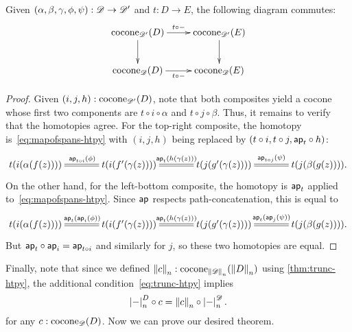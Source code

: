 \begin{lem}\label{thm:conemap-funct}
  Given $(\alpha,\beta,\gamma,\phi,\psi):\Ddiag \to \Ddiag'$ and $t:D\to E$, the following diagram commutes:
  \begin{equation*}
    \vcenter{\xymatrix{
        \cocone{\Ddiag'}{D}\ar[r]^-{t\circ -}\ar[d] &
        \cocone{\Ddiag'}{E}\ar[d]\\
        \cocone{\Ddiag}{D}\ar[r]_-{t\circ -} &
        \cocone{\Ddiag}{E}
      }}
  \end{equation*}
\end{lem}
\begin{proof}
  Given $(i,j,h):\cocone{\Ddiag'}{D}$, note that both composites yield a cocone whose first two components are $t\circ i\circ \alpha$ and $t\circ j\circ\beta$.
  Thus, it remains to verify that the homotopies agree.
  For the top-right composite, the homotopy is~\eqref{eq:mapofspans-htpy} with $(i,j,h)$ being replaced by $(t\circ i, t\circ j, \apfunc{t}\circ h)$:
  \begin{equation*}
    \xymatrix@C=3pc{
      t(i(\alpha(f(z)))) \ar@{=}[r]^{\apfunc{t\circ i}(\phi)} &
      t(i(f'(\gamma(z)))) \ar@{=}[r]^{\apfunc{t}(h(\gamma(z)))} &
      t(j(g'(\gamma(z)))) \ar@{=}[r]^{\apfunc{t\circ j}(\psi)} &
      t(j(\beta(g(z)))). }
  \end{equation*}
  On the other hand, for the left-bottom composite, the homotopy is $\apfunc{t}$ applied to~\eqref{eq:mapofspans-htpy}.
  Since $\apfunc{}$ respects path-concatenation, this is equal to
  \begin{equation*}
    \xymatrix@C=3pc{
      t(i(\alpha(f(z)))) \ar@{=}[r]^{\apfunc{t}(\apfunc{i}(\phi))} &
      t(i(f'(\gamma(z)))) \ar@{=}[r]^{\apfunc{t}(h(\gamma(z)))} &
      t(j(g'(\gamma(z)))) \ar@{=}[r]^{\apfunc{t}(\apfunc{j}(\psi))} &
      t(j(\beta(g(z)))). }
  \end{equation*}
  But $\apfunc{t}\circ \apfunc{i} = \apfunc{t\circ i}$ and similarly for $j$, so these two homotopies are equal.
\end{proof}

Finally, note that since we defined $\trunc nc : \cocone{\trunc n \Ddiag}{\trunc n D}$ using \autoref{thm:trunc-htpy}, the additional condition~\eqref{eq:trunc-htpy} implies
\begin{equation}
  \tproj[D] n- \circ c = \trunc n c \circ \tproj[\Ddiag]n- .\label{eq:conetrunc}
\end{equation}
for any $c:\cocone{\Ddiag}{D}$.
Now we can prove our desired theorem.

